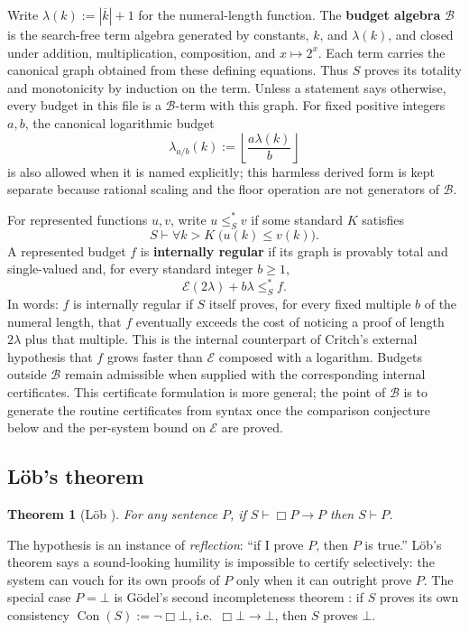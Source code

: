 \documentclass[11pt]{amsart}
\theoremstyle{plain}
\newtheorem{theorem}{Theorem}[section]
\theoremstyle{definition}
\newcommand{\Con}{\operatorname{Con}}
\newcommand{\num}[1]{\overline{#1}}
\newcommand{\Bud}{\mathcal{B}}
\newcommand{\leSstar}{\mathrel{\leq_S^{*}}}
\begin{document}
Write $\lambda(k):=|\num{k}|+1$ for the numeral-length function. The \textbf{budget algebra} $\Bud$ is the search-free term algebra generated by constants, $k$, and $\lambda(k)$, and closed under addition, multiplication, composition, and $x\mapsto 2^x$. Each term carries the canonical graph obtained from these defining equations. Thus $S$ proves its totality and monotonicity by induction on the term. Unless a statement says otherwise, every budget in this file is a $\Bud$-term with this graph. For fixed positive integers $a,b$, the canonical logarithmic budget
\[
\lambda_{a/b}(k):=\left\lfloor\frac{a\lambda(k)}{b}\right\rfloor
\]
is also allowed when it is named explicitly; this harmless derived form is kept separate because rational scaling and the floor operation are not generators of $\Bud$.

For represented functions $u,v$, write $u\leSstar v$ if some standard $K$ satisfies
\[
S\vdash\forall k>K\;\bigl(u(k)\le v(k)\bigr).
\]
A represented budget $f$ is \textbf{internally regular} if its graph is provably total and single-valued and, for every standard integer $b\ge1$,
\[
\mathcal{E}(2\lambda)+b\lambda\leSstar f.
\]
In words: $f$ is internally regular if $S$ itself proves, for every fixed multiple $b$ of the numeral length, that $f$ eventually exceeds the cost of noticing a proof of length $2\lambda$ plus that multiple. This is the internal counterpart of Critch's external hypothesis that $f$ grows faster than $\mathcal{E}$ composed with a logarithm.
Budgets outside $\Bud$ remain admissible when supplied with the corresponding internal certificates. This certificate formulation is more general; the point of $\Bud$ is to generate the routine certificates from syntax once the comparison conjecture below and the per-system bound on $\mathcal E$ are proved.

\subsection{L\"ob's theorem}
\label{sec:lob}

\begin{theorem}[L\"ob \cite{lob1955}]
\label{thm:lob}
For any sentence $P$, if $S \vdash \Box P \to P$ then $S \vdash P$.
\end{theorem}

The hypothesis is an instance of \emph{reflection}: ``if I prove $P$, then $P$ is true.'' L\"ob's theorem says a sound-looking humility is impossible to certify selectively: the system can vouch for its own proofs of $P$ only when it can outright prove $P$. The special case $P = \bot$ is G\"odel's second incompleteness theorem \cite{godel1931}: if $S$ proves its own consistency $\Con(S) := \neg\Box\bot$, i.e.\ $\Box\bot \to \bot$, then $S$ proves $\bot$.
\end{document}
